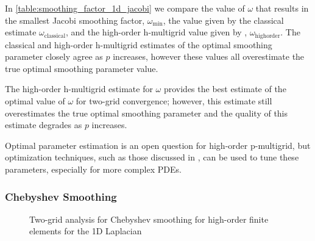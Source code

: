 \documentclass[review]{siamart190516}
\begin{document}
In \cref{table:smoothing_factor_1d_jacobi} we compare the value of $\omega$ that results in the smallest Jacobi smoothing factor, $\omega_{\min}$, the value given by the classical estimate $\omega_{\text{classical}}$, and the high-order h-multigrid value given by \cite{he2020two}, $\omega_{\text{highorder}}$.
The classical and high-order h-multigrid estimates of the optimal smoothing parameter closely agree as $p$ increases, however these values all overestimate the true optimal smoothing parameter value.

The high-order h-multigrid estimate for $\omega$ provides the best estimate of the optimal value of $\omega$ for two-grid convergence; however, this estimate still overestimates the true optimal smoothing parameter and the quality of this estimate degrades as $p$ increases.

Optimal parameter estimation is an open question for high-order p-multigrid, but optimization techniques, such as those discussed in \cite{brown2021tuning}, can be used to tune these parameters, especially for more complex PDEs.

\subsubsection{Chebyshev Smoothing}

\begin{figure}[!tbp]
  \centering
  \caption{Two-grid analysis for Chebyshev smoothing for high-order finite elements for the 1D Laplacian}
\end{figure}
\end{document}
